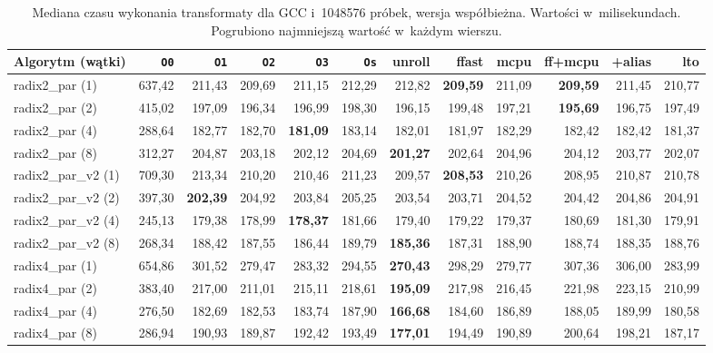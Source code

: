 \begin{table}[H]
\centering
\caption{Mediana czasu wykonania transformaty dla GCC i~1048576 próbek, wersja współbieżna. Wartości w~milisekundach. Pogrubiono najmniejszą wartość w~każdym wierszu.}
\label{tab:par-med-gcc-1M}
\scriptsize
\setlength{\tabcolsep}{3.0pt}
\begin{tabular}{lrrrrrrrrrrr}
\toprule
Algorytm (wątki) & \texttt{O0} & \texttt{O1} & \texttt{O2} & \texttt{O3} & \texttt{Os} & unroll & ffast & mcpu & ff+mcpu & +alias & lto \\
\midrule
radix2\_par (1) & 637,42 & 211,43 & 209,69 & 211,15 & 212,29 & 212,82 & \textbf{209,59} & 211,09 & \textbf{209,59} & 211,45 & 210,77 \\
radix2\_par (2) & 415,02 & 197,09 & 196,34 & 196,99 & 198,30 & 196,15 & 199,48 & 197,21 & \textbf{195,69} & 196,75 & 197,49 \\
radix2\_par (4) & 288,64 & 182,77 & 182,70 & \textbf{181,09} & 183,14 & 182,01 & 181,97 & 182,29 & 182,42 & 182,42 & 181,37 \\
radix2\_par (8) & 312,27 & 204,87 & 203,18 & 202,12 & 204,69 & \textbf{201,27} & 202,64 & 204,96 & 204,12 & 203,77 & 202,07 \\
\addlinespace
radix2\_par\_v2 (1) & 709,30 & 213,34 & 210,20 & 210,46 & 211,23 & 209,57 & \textbf{208,53} & 210,26 & 208,95 & 210,87 & 210,78 \\
radix2\_par\_v2 (2) & 397,30 & \textbf{202,39} & 204,92 & 203,84 & 205,25 & 203,54 & 203,71 & 204,52 & 204,42 & 204,86 & 204,91 \\
radix2\_par\_v2 (4) & 245,13 & 179,38 & 178,99 & \textbf{178,37} & 181,66 & 179,40 & 179,22 & 179,37 & 180,69 & 181,30 & 179,91 \\
radix2\_par\_v2 (8) & 268,34 & 188,42 & 187,55 & 186,44 & 189,79 & \textbf{185,36} & 187,31 & 188,90 & 188,74 & 188,35 & 188,76 \\
\addlinespace
radix4\_par (1) & 654,86 & 301,52 & 279,47 & 283,32 & 294,55 & \textbf{270,43} & 298,29 & 279,77 & 307,36 & 306,00 & 283,99 \\
radix4\_par (2) & 383,40 & 217,00 & 211,01 & 215,11 & 218,61 & \textbf{195,09} & 217,98 & 216,45 & 221,98 & 223,15 & 210,99 \\
radix4\_par (4) & 276,50 & 182,69 & 182,53 & 183,74 & 187,90 & \textbf{166,68} & 184,60 & 186,89 & 188,05 & 189,99 & 180,58 \\
radix4\_par (8) & 286,94 & 190,93 & 189,87 & 192,42 & 193,49 & \textbf{177,01} & 194,49 & 190,89 & 200,64 & 198,21 & 187,17 \\
\bottomrule
\end{tabular}
\end{table}


